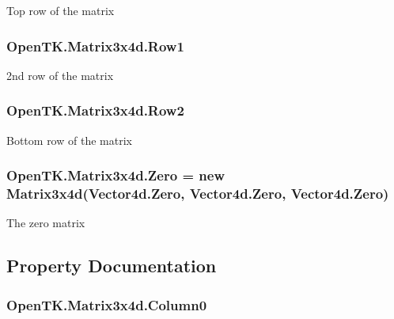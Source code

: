 Top row of the matrix 

\hypertarget{struct_open_t_k_1_1_matrix3x4d_aef944d57f7b06860e76e7882f48c4813}{
\subsubsection[{Row1}]{ Open\-T\-K.\-Matrix3x4d.\-Row1}}\label{struct_open_t_k_1_1_matrix3x4d_aef944d57f7b06860e76e7882f48c4813}


2nd row of the matrix 

\hypertarget{struct_open_t_k_1_1_matrix3x4d_a63d59cd2ae94d2a335ce2f21019af9d1}{
\subsubsection[{Row2}]{ Open\-T\-K.\-Matrix3x4d.\-Row2}}\label{struct_open_t_k_1_1_matrix3x4d_a63d59cd2ae94d2a335ce2f21019af9d1}


Bottom row of the matrix 

\hypertarget{struct_open_t_k_1_1_matrix3x4d_a658c68810b19d74d3fd27d136eed49ae}{
\subsubsection[{Zero}]{ Open\-T\-K.\-Matrix3x4d.\-Zero = new {\bf Matrix3x4d}(Vector4d.\-Zero, Vector4d.\-Zero, Vector4d.\-Zero)\hspace{0.3cm}{\ttfamily [static]}}}\label{struct_open_t_k_1_1_matrix3x4d_a658c68810b19d74d3fd27d136eed49ae}


The zero matrix 



\subsection{Property Documentation}
\hypertarget{struct_open_t_k_1_1_matrix3x4d_a594edb2d3bb149cc0ad0e03686d65a71}{
\subsubsection[{Column0}]{ Open\-T\-K.\-Matrix3x4d.\-Column0\hspace{0.3cm}{\ttfamily [get]}}}\label{struct_open_t_k_1_1_matrix3x4d_a594edb2d3bb149cc0ad0e03686d65a71}


